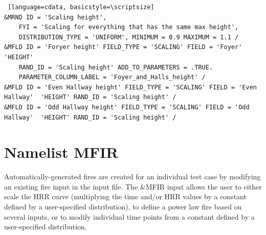 \documentclass[12pt,twoside]{book}
\begin{document}
\vspace{\baselineskip}
\begin{lstlisting} [language=cdata, basicstyle=\scriptsize]
&MRND ID = 'Scaling height', 
	FYI = 'Scaling for everything that has the same max height', 
	DISTRIBUTION_TYPE = 'UNIFORM', MINIMUM = 0.9 MAXIMUM = 1.1 /
&MFLD ID = 'Foryer height' FIELD_TYPE = 'SCALING' FIELD = 'Foyer'  'HEIGHT'
    RAND_ID = 'Scaling height' ADD_TO_PARAMETERS = .TRUE. 
    PARAMETER_COLUMN_LABEL = 'Foyer_and_Halls_height' /
&MFLD ID = 'Even Hallway height' FIELD_TYPE = 'SCALING' FIELD = 'Even Hallway'  'HEIGHT' RAND_ID = 'Scaling height' /
&MFLD ID = 'Odd Hallway height' FIELD_TYPE = 'SCALING' FIELD = 'Odd Hallway'  'HEIGHT' RAND_ID = 'Scaling height' /
\end{lstlisting}

\clearpage

\section{Namelist MFIR}
\label{info:MFIR}

Automatically-generated fires are created for an individual test case by modifying an existing fire input in the input file. The {\ct \&MFIR} input allows the user to either scale the HRR curve (multiplying the time and/or HRR values by a constant defined by a user-specified distribution), to define a power law fire based on several inputs, or to modify individual time points from a constant defined by a user-specified distribution.
\end{document}
